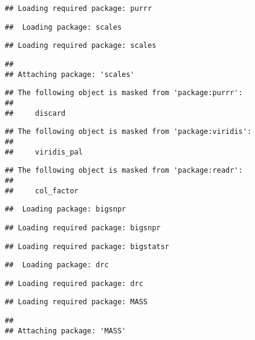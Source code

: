 \documentclass[
]{article}
\begin{document}
\begin{verbatim}
## Loading required package: purrr
\end{verbatim}

\begin{verbatim}
##  Loading package: scales
\end{verbatim}

\begin{verbatim}
## Loading required package: scales
\end{verbatim}

\begin{verbatim}
## 
## Attaching package: 'scales'
\end{verbatim}

\begin{verbatim}
## The following object is masked from 'package:purrr':
## 
##     discard
\end{verbatim}

\begin{verbatim}
## The following object is masked from 'package:viridis':
## 
##     viridis_pal
\end{verbatim}

\begin{verbatim}
## The following object is masked from 'package:readr':
## 
##     col_factor
\end{verbatim}

\begin{verbatim}
##  Loading package: bigsnpr
\end{verbatim}

\begin{verbatim}
## Loading required package: bigsnpr
\end{verbatim}

\begin{verbatim}
## Loading required package: bigstatsr
\end{verbatim}

\begin{verbatim}
##  Loading package: drc
\end{verbatim}

\begin{verbatim}
## Loading required package: drc
\end{verbatim}

\begin{verbatim}
## Loading required package: MASS
\end{verbatim}

\begin{verbatim}
## 
## Attaching package: 'MASS'
\end{verbatim}
\end{document}

